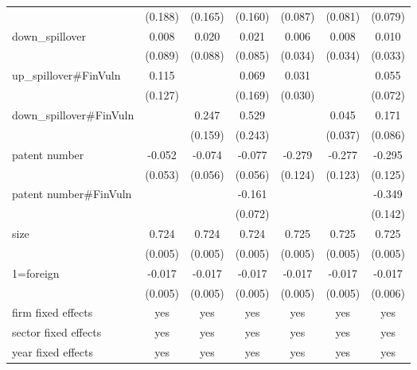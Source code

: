\documentclass[12pt]{article}%
\begin{document}
\begin{CJK*}{GBK}{fs}
\begin{table}[!h]
{{{\begin{tabular}{l*{6}{c}}
           &    (0.188) &    (0.165) &    (0.160) &    (0.087) &    (0.081) &    (0.079) \\

down\_spillover &      0.008 &      0.020 &      0.021 &      0.006 &      0.008 &      0.010 \\

           &    (0.089) &    (0.088) &    (0.085) &    (0.034) &    (0.034) &    (0.033) \\
up\_spillover\#FinVuln &      0.115 &            &      0.069 &      0.031 &            &      0.055 \\

           &    (0.127) &            &    (0.169) &    (0.030) &            &    (0.072) \\

down\_spillover\#FinVuln &            &      0.247 &    0.529\sym{**} &            &      0.045 &     0.171\sym{*} \\

           &            &    (0.159) &    (0.243) &            &    (0.037) &    (0.086) \\

patent number &     -0.052 &     -0.074 &     -0.077 &   -0.279\sym{**} &   -0.277\sym{**} &   -0.295\sym{**} \\

           &    (0.053) &    (0.056) &    (0.056) &    (0.124) &    (0.123) &    (0.125) \\
patent number\#FinVuln &            &            &   -0.161\sym{**} &            &            &   -0.349\sym{**} \\

           &            &            &    (0.072) &            &            &    (0.142) \\
      size &   0.724\sym{***} &   0.724\sym{***} &   0.724\sym{***} &   0.725\sym{***} &   0.725\sym{***} &   0.725\sym{***} \\

           &    (0.005) &    (0.005) &    (0.005) &    (0.005) &    (0.005) &    (0.005) \\

 1=foreign &  -0.017\sym{***} &  -0.017\sym{***} &  -0.017\sym{***} &  -0.017\sym{***} &  -0.017\sym{***} &  -0.017\sym{***} \\

           &    (0.005) &    (0.005) &    (0.005) &    (0.005) &    (0.005) &    (0.006) \\
firm fixed effects      &     yes         &       yes&     yes     &      yes&      yes        &     yes\\
sector fixed effects      &     yes         &       yes&     yes     &      yes&      yes        &     yes\\
year fixed effects      &     yes         &       yes&     yes     &      yes&      yes        &     yes\\


\end{tabular}}}}
\end{table}
\end{CJK*}
\end{document}
